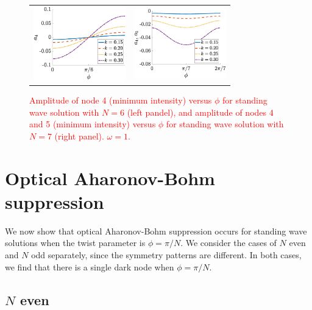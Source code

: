 \documentclass[reprint, amsmath,amssymb,aps,pra]{revtex4-2}
\renewcommand{\revised}[1]{ \textcolor{red}{#1} }
\begin{document}
\begin{figure}
    \begin{center}
    \begin{tabular}{cc}
    \includegraphics[width=4cm]{images/ABsuppression.eps} &
    \includegraphics[width=4cm]{images/noABsuppression.eps} 
    \end{tabular}
    \end{center}
    \caption{\revised{Amplitude of node 4 (minimum intensity) versus $\phi$ for standing wave solution with $N=6$ (left pandel), and amplitude of nodes 4 and 5 (minimum intensity) versus $\phi$ for standing wave solution with $N=7$ (right panel). $\omega = 1$.}}
    \label{fig:ABsuppression}
\end{figure}


\section{Optical Aharonov-Bohm suppression}\label{sec:ABsupp}

We now show that optical Aharonov-Bohm suppression occurs for standing wave solutions when the twist parameter is $\phi = \pi/N$. We consider the cases of $N$ even and $N$ odd separately, since the symmetry patterns are different. In both cases, we find that there is a single dark node when $\phi = \pi/N$.

\subsection{\texorpdfstring{$N$}{N} even}\label{sec:Neven}
\end{document}
